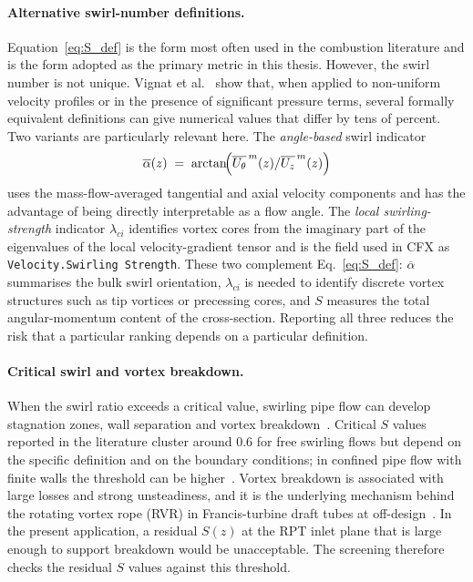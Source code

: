 \paragraph{Alternative swirl-number definitions.}
Equation~\ref{eq:S_def} is the form most often used in the combustion literature and is the form adopted as the primary metric in this thesis. However, the swirl number is not unique. Vignat et al.~\cite{Vignat2022} show that, when applied to non-uniform velocity profiles or in the presence of significant pressure terms, several formally equivalent definitions can give numerical values that differ by tens of percent. Two variants are particularly relevant here. The \emph{angle-based} swirl indicator
\begin{equation}
\overline{\alpha}(z) \;=\; \arctan\!\Bigl(\overline{U_\theta}^{\,m}(z)/\overline{U_z}^{\,m}(z)\Bigr)
\label{eq:alpha_bar}
\end{equation}
uses the mass-flow-averaged tangential and axial velocity components and has the advantage of being directly interpretable as a flow angle. The \emph{local swirling-strength} indicator $\lambda_{ci}$ identifies vortex cores from the imaginary part of the eigenvalues of the local velocity-gradient tensor and is the field used in CFX as \texttt{Velocity.Swirling Strength}. These two complement Eq.~\ref{eq:S_def}: $\overline{\alpha}$ summarises the bulk swirl orientation, $\lambda_{ci}$ is needed to identify discrete vortex structures such as tip vortices or precessing cores, and $S$ measures the total angular-momentum content of the cross-section. Reporting all three reduces the risk that a particular ranking depends on a particular definition.
 
\paragraph{Critical swirl and vortex breakdown.}
When the swirl ratio exceeds a critical value, swirling pipe flow can develop stagnation zones, wall separation and vortex breakdown~\cite{Rusak2014}. Critical $S$ values reported in the literature cluster around 0.6 for free swirling flows but depend on the specific definition and on the boundary conditions; in confined pipe flow with finite walls the threshold can be higher~\cite{Rusak2014}. Vortex breakdown is associated with large losses and strong unsteadiness, and it is the underlying mechanism behind the rotating vortex rope (RVR) in Francis-turbine draft tubes at off-design~\cite{Brekke2010}. In the present application, a residual $S(z)$ at the RPT inlet plane that is large enough to support breakdown would be unacceptable. The screening therefore checks the residual $S$ values against this threshold.
 
